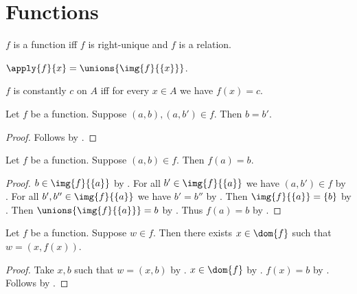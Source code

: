 \section{Functions}






\begin{abbreviation}\label{function}
    $f$ is a function iff $f$ is right-unique and $f$ is a relation.
\end{abbreviation}

\begin{definition}\label{apply}
    $\apply{f}{x} = \unions{\img{f}{\{x\}}}$.
\end{definition}

\begin{abbreviation}\label{constantly_on}
    $f$ is constantly $c$ on $A$ iff
        for every $x\in A$ we have $f(x)=c$.
\end{abbreviation}

\begin{proposition}\label{function_rightunique}
    Let $f$ be a function.
    Suppose $(a,b), (a, b')\in f$.
    Then $b = b'$.
\end{proposition}
\begin{proof}
    Follows by .
\end{proof}

\begin{proposition}\label{function_apply_intro}
    Let $f$ be a function.
    Suppose $(a,b)\in f$.
    Then $f(a) = b$.
\end{proposition}
\begin{proof}
    $b\in\img{f}{\{a\}}$ by .
    For all $b'\in \img{f}{\{a\}}$ we have $(a, b')\in f$
        by .
    For all $b', b''\in \img{f}{\{a\}}$ we have $b' = b''$ by .
    Then $\img{f}{\{a\}} = \{b\}$ by .
    Then $\unions{\img{f}{\{a\}}} = b$ by .
    Thus $f(a) = b$ by .
\end{proof}

\begin{proposition}\label{function_member_elim}
    Let $f$ be a function.
    Suppose $w\in f$.
    Then there exists $x\in\dom{f}$ such that $w = (x, f(x))$.
\end{proposition}
\begin{proof}
    Take $x,b$ such that $w = (x,b)$ by .
    $x\in\dom{f}$ by .
    $f(x) = b$ by .
    Follows by \auto.
\end{proof}

